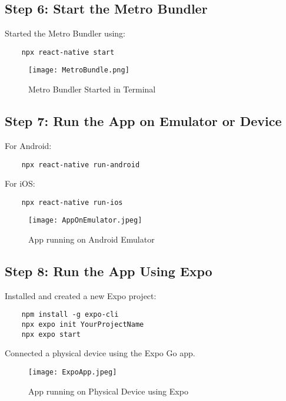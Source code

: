 \documentclass{article}
\begin{document}
\subsection{Step 6: Start the Metro Bundler}
Started the Metro Bundler using:
\begin{verbatim}
    npx react-native start
\end{verbatim}

\begin{figure}[H]
    \centering
    \texttt{[image: MetroBundle.png]}
    \caption{Metro Bundler Started in Terminal}
    \label{fig:metro_bundler}
\end{figure}

\subsection{Step 7: Run the App on Emulator or Device}
For Android:
\begin{verbatim}
    npx react-native run-android
\end{verbatim}
For iOS:
\begin{verbatim}
    npx react-native run-ios
\end{verbatim}

\begin{figure}[H]
    \centering
    \texttt{[image: AppOnEmulator.jpeg]}
    \caption{App running on Android Emulator}
    \label{fig:emulator}
\end{figure}

\subsection{Step 8: Run the App Using Expo}
Installed and created a new Expo project:
\begin{verbatim}
    npm install -g expo-cli
    npx expo init YourProjectName
    npx expo start
\end{verbatim}
Connected a physical device using the Expo Go app.

\begin{figure}[H]
    \centering
    \texttt{[image: ExpoApp.jpeg]}
    \caption{App running on Physical Device using Expo}
    \label{fig:expo_device}
\end{figure}
\end{document}
